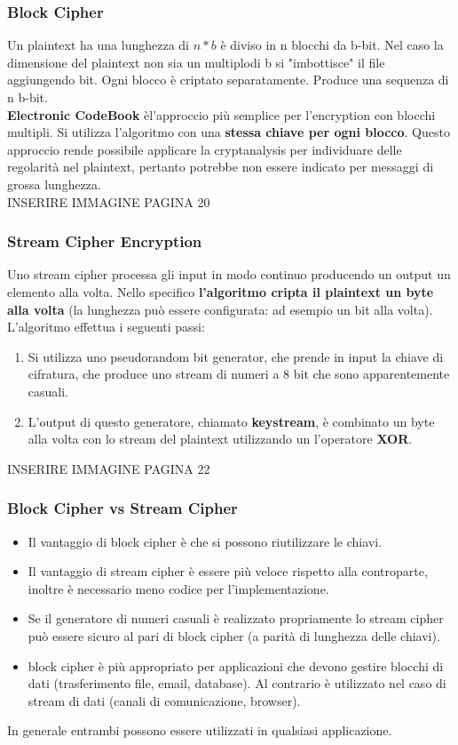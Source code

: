 \documentclass[12pt]{article}
\begin{document}
		\subsubsection{Block Cipher}
			Un plaintext ha una lunghezza di $n*b$ è diviso in n blocchi da b-bit. Nel caso la dimensione del plaintext non sia un multiplodi b si "imbottisce" il file aggiungendo bit. Ogni blocco è criptato separatamente. Produce una sequenza di n b-bit. \\
			\textbf{Electronic CodeBook} èl'approccio più semplice per l'encryption con blocchi multipli. Si utilizza l'algoritmo con una \textbf{stessa chiave per ogni blocco}. Questo approccio rende possibile applicare la cryptanalysis per individuare delle regolarità nel plaintext, pertanto potrebbe non essere indicato per messaggi di grossa lunghezza. \\
			INSERIRE IMMAGINE PAGINA 20\\
		\subsubsection{Stream Cipher Encryption}
			Uno stream cipher processa gli input in modo continuo producendo un output un elemento alla volta. Nello specifico \textbf{l'algoritmo cripta il plaintext un byte alla volta} (la lunghezza può essere configurata: ad esempio un bit alla volta). L'algoritmo effettua i seguenti passi:
			\begin{enumerate}
				\item Si utilizza uno pseudorandom bit generator, che prende in input la chiave di cifratura, che produce uno stream di numeri a 8 bit che sono apparentemente casuali.
				\item L'output di questo generatore, chiamato \textbf{keystream}, è combinato un byte alla volta con lo stream del plaintext utilizzando un l'operatore \textbf{XOR}.
			\end{enumerate}
			INSERIRE IMMAGINE PAGINA 22\\
		\subsubsection{Block Cipher vs Stream Cipher}
			\begin{itemize}
				\item Il vantaggio di block cipher è che si possono riutilizzare le chiavi.
				\item Il vantaggio di stream cipher è essere più veloce rispetto alla controparte, inoltre è necessario meno codice per l'implementazione.
				\item Se il generatore di numeri casuali è realizzato propriamente lo stream cipher può essere sicuro al pari di block cipher (a parità di lunghezza delle chiavi).
				\item block cipher è più appropriato per applicazioni che devono gestire blocchi di dati (trasferimento file, email, database). Al contrario è utilizzato nel caso di stream di dati (canali di comunicazione, browser).
			\end{itemize}
			In generale entrambi possono essere utilizzati in qualsiasi applicazione.
\end{document}

